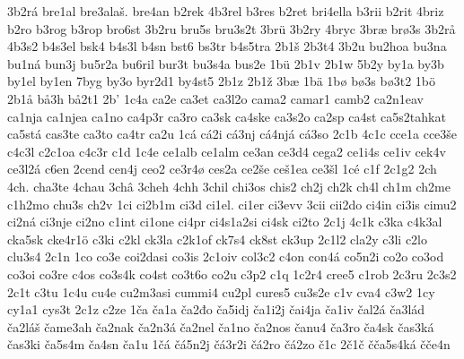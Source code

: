{    3b2rá
    bre1al
    bre3alaš.
    bre4an
    b2rek
    4b3rel
    b3res
    b2ret
    bri4ella
    b3rii
    b2rit
    4briz
    b2ro
    b3rog
    b3rop
    bro6st
    3b2ru
    bru5s
    bru3s2t
    3brü
    3b2ry
    4bryc
    3bræ
    brø3s
    3b2rå
    4b3s2
    b4s3el
    bsk4
    b4s3l
    b4sn
    bst6
    bs3tr
    b4s5tra
    2b1š
    2b3t4
    3b2u
    bu2hoa
    bu3na
    bu1ná
    bun3j
    bu5r2a
    bu6ril
    bur3t
    bu3s4a
    bus2e
    1bü
    2b1v
    2b1w
    5b2y
    by1a
    by3b
    by1el
    by1en
    7byg
    by3o
    byr2d1
    by4st5
    2b1z
    2b1ž
    3bæ
    1bä
    1bø
    bø3s
    bø3t2
    1bö
    2b1å
    bå3h
    bå2t1
    2b'
    1c4a
    ca2e
    ca3et
    ca3l2o
    cama2
    camar1
    camb2
    ca2n1eav
    ca1nja
    ca1njea
    ca1no
    ca4p3r
    ca3ro
    ca3sk
    ca4ske
    ca3s2o
    ca2sp
    ca4st
    ca5s2tahkat
    ca5stá
    cas3te
    ca3to
    ca4tr
    ca2u
    1cá
    cá2i
    cá3nj
    cá4njá
    cá3so
    2c1b
    4c1c
    cce1a
    cce3še
    c4c3l
    c2c1oa
    c4c3r
    c1d
    1c4e
    ce1alb
    ce1alm
    ce3an
    ce3d4
    cega2
    ce1i4s
    ce1iv
    cek4v
    ce3l2á
    c6en
    2cend
    cen4j
    ceo2
    ce3r4ø
    ces2a
    ce2še
    ceš1ea
    ce3šl
    1cé
    c1f
    2c1g2
    2ch
    4ch.
    cha3te
    4chau
    3châ
    3cheh
    4chh
    3chil
    chi3os
    chis2
    ch2j
    ch2k
    ch4l
    ch1m
    ch2me
    c1h2mo
    chu3s
    ch2v
    1ci
    ci2b1m
    ci3d
    ci1el.
    ci1er
    ci3evv
    3cii
    cii2do
    ci4in
    ci3is
    cimu2
    ci2ná
    ci3nje
    ci2no
    c1int
    ci1one
    ci4pr
    ci4s1a2si
    ci4sk
    ci2to
    2c1j
    4c1k
    c3ka
    c4k3al
    cka5sk
    cke4r1ö
    c3ki
    c2kl
    ck3la
    c2k1of
    ck7s4
    ck8st
    ck3up
    2c1l2
    cla2y
    c3li
    c2lo
    clu3s4
    2c1n
    1co
    co3e
    coi2dasi
    co3is
    2c1oiv
    col3c2
    c4on
    con4á
    co5n2i
    co2o
    co3od
    co3oi
    co3re
    c4os
    co3s4k
    co4st
    co3t6o
    co2u
    c3p2
    c1q
    1c2r4
    cree5
    c1rob
    2c3ru
    2c3s2
    2c1t
    c3tu
    1c4u
    cu4e
    cu2m3asi
    cummi4
    cu2pl
    cures5
    cu3s2e
    c1v
    cva4
    c3w2
    1cy
    cy1a1
    cys3t
    2c1z
    c2ze
    1ča
    ča1a
    ča2đo
    ča5idj
    ča1i2j
    čai4ja
    ča1iv
    čal2á
    ča3lád
    ča2láš
    čame3ah
    ča2nak
    ča2n3á
    ča2nel
    ča1no
    ča2nos
    čanu4
    ča3ro
    ča4sk
    čas3ká
    čas3ki
    ča5s4m
    ča4sn
    ča1u
    1čá
    čá5n2j
    čá3r2i
    čá2ro
    čá2zo
    č1c
    2č1č
    čča5s4ká
    čče4n
}
